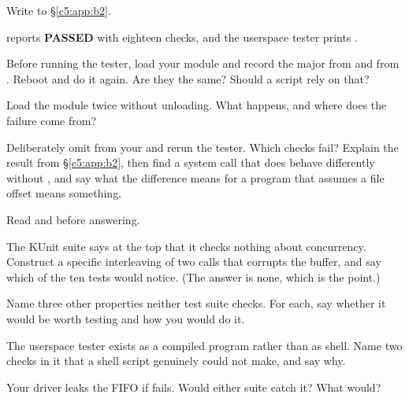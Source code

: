 \label{c5:ex:7}

Write  to \S\ref{c5:app:b2}.

\checkyourself {} reports \textbf{PASSED} with eighteen checks, and the
userspace tester prints .

 Before running the tester, load your module and record the major from 
and from . Reboot and do it again. Are they the same? Should a script rely on that?

 Load the module twice without unloading. What happens, and where does the failure come
from?

 Deliberately omit  from your  and rerun the tester. Which
checks fail? Explain the result from \S\ref{c5:app:b2}, then find a system call that does behave
differently without , and say what the difference means for a program that assumes
a file offset means something.

\label{c5:ex:8}

Read  and  before
answering.

 The KUnit suite says at the top that it checks nothing about concurrency. Construct a
specific interleaving of two  calls that corrupts the buffer, and say which of the
ten tests would notice. (The answer is none, which is the point.)

 Name three other properties neither test suite checks. For each, say whether it would be
worth testing and how you would do it.

 The userspace tester exists as a compiled program rather than as shell. Name two checks in
it that a shell script genuinely could not make, and say why.

 Your driver leaks the FIFO if  fails. Would either suite catch it? What
would?

\label{c5:ex:9}

